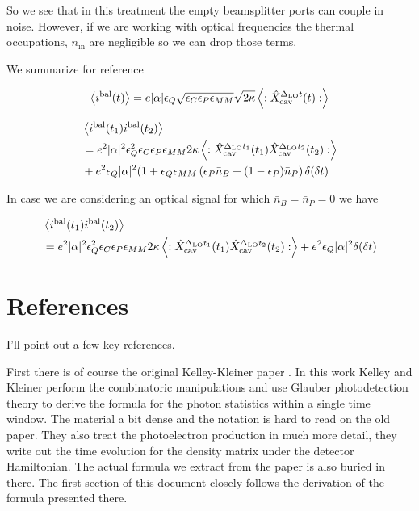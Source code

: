 \documentclass[12pt]{article}
\newcommand{\ep}{\epsilon}
\begin{document}
So we see that in this treatment the empty beamsplitter ports can couple in noise. However, if we are working with optical frequencies the thermal occupations, $\bar{n}_{\text{in}}$ are negligible so we can drop those terms.

We summarize for reference

\begin{align}
\Braket{i^{\text{bal}}(t)} &= e|\alpha|\ep_Q \sqrt{\ep_C \ep_P \ep_{MM}} \sqrt{2\kappa} \Braket{:\hat{X}_{\text{cav}}^{\Delta_{\text{LO}}t}(t):}\\
\end{align}

\begin{align}
&\Braket{i^{\text{bal}}(t_1)i^{\text{bal}}(t_2)}\\
&= e^2 |\alpha|^2 \ep_Q^2 \ep_C \ep_P \ep_{MM} 2\kappa \Braket{:\hat{X}_{\text{cav}}^{\Delta_{\text{LO}}t_1}(t_1)\hat{X}_{\text{cav}}^{\Delta_{\text{LO}}t_2}(t_2) :}\\
&+ e^2 \ep_Q |\alpha|^2(1+\ep_Q\ep_{MM}\left(\ep_P\bar{n}_B + (1-\ep_P)\bar{n}_P\right) \delta(\delta t)
\end{align}

In case we are considering an optical signal for which $\bar{n}_B = \bar{n}_P=0$ we have

\begin{align}
&\Braket{i^{\text{bal}}(t_1)i^{\text{bal}}(t_2)}\\
&= e^2 |\alpha|^2 \ep_Q^2 \ep_C \ep_P \ep_{MM} 2\kappa \Braket{:\hat{X}_{\text{cav}}^{\Delta_{\text{LO}}t_1}(t_1)\hat{X}_{\text{cav}}^{\Delta_{\text{LO}}t_2}(t_2) :} + e^2 \ep_Q |\alpha|^2\delta(\delta t)
\end{align}


\section{References}

I'll point out a few key references.

First there is of course the original Kelley-Kleiner paper \cite{Kelley1964}. In this work Kelley and Kleiner perform the combinatoric manipulations and use Glauber photodetection theory \cite{Glauber1963} to derive the formula for the photon statistics within a single time window. The material a bit dense and the notation is hard to read on the old paper. They also treat the photoelectron production in much more detail, they write out the time evolution for the density matrix under the detector Hamiltonian. The actual formula we extract from the paper is also buried in there. The first section of this document closely follows the derivation of the formula presented there.
\end{document}
